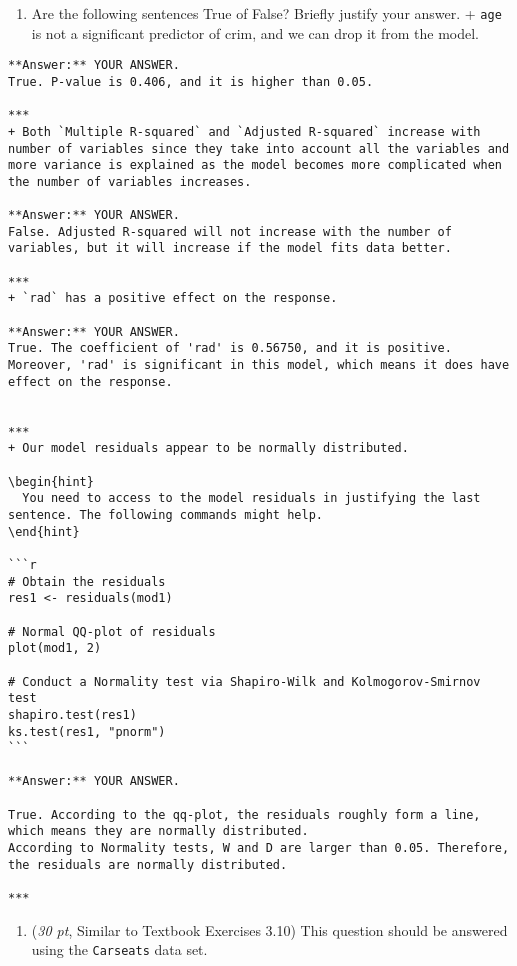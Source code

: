 \documentclass[
]{article}
\providecommand{\tightlist}{%
  \setlength{\itemsep}{0pt}\setlength{\parskip}{0pt}}
\begin{document}
\begin{enumerate}
  \begin{center}\rule{0.5\linewidth}{\linethickness}\end{center}
\item
  Are the following sentences True of False? Briefly justify your
  answer. + \texttt{age} is not a significant predictor of crim, and we
  can drop it from the model.
\end{enumerate}

\begin{verbatim}
**Answer:** YOUR ANSWER.
True. P-value is 0.406, and it is higher than 0.05.

***
+ Both `Multiple R-squared` and `Adjusted R-squared` increase with number of variables since they take into account all the variables and more variance is explained as the model becomes more complicated when the number of variables increases. 

**Answer:** YOUR ANSWER.
False. Adjusted R-squared will not increase with the number of variables, but it will increase if the model fits data better.

***    
+ `rad` has a positive effect on the response.

**Answer:** YOUR ANSWER.
True. The coefficient of 'rad' is 0.56750, and it is positive. Moreover, 'rad' is significant in this model, which means it does have effect on the response.


***
+ Our model residuals appear to be normally distributed.

\begin{hint}
  You need to access to the model residuals in justifying the last sentence. The following commands might help.
\end{hint}

```r
# Obtain the residuals
res1 <- residuals(mod1)

# Normal QQ-plot of residuals
plot(mod1, 2)

# Conduct a Normality test via Shapiro-Wilk and Kolmogorov-Smirnov test
shapiro.test(res1)
ks.test(res1, "pnorm")
```

**Answer:** YOUR ANSWER.

True. According to the qq-plot, the residuals roughly form a line, which means they are normally distributed.
According to Normality tests, W and D are larger than 0.05. Therefore, the residuals are normally distributed.

***
\end{verbatim}

\begin{enumerate}
\def\labelenumi{\arabic{enumi}.}
\setcounter{enumi}{1}
\tightlist
\item
  (\emph{30 pt}, Similar to Textbook Exercises 3.10) This question
  should be answered using the \texttt{Carseats} data set.
\end{enumerate}
\end{document}
